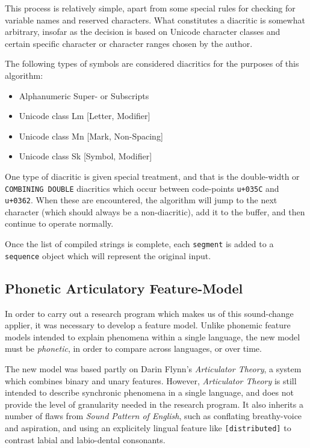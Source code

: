 \documentclass[10pt,letterpaper]{article}
\begin{document}
This process is relatively simple, apart from some special rules for checking for variable names and reserved characters. What constitutes a diacritic is somewhat arbitrary, insofar as the decision is based on Unicode character classes and certain specific character or character ranges chosen by the author.

The following types of symbols are considered diacritics for the purposes of this algorithm:
\begin{itemize}
\itemsep1pt \parskip0pt  
\item Alphanumeric Super- or Subscripts
\item Unicode class Lm [Letter, Modifier]
\item Unicode class Mn [Mark, Non-Spacing]
\item Unicode class Sk [Symbol, Modifier]
\end{itemize}

One type of diacritic is given special treatment, and that is the double-width or \texttt{COMBINING DOUBLE} diacritics which occur between code-points \texttt{u+035C} and \texttt{u+0362}. When these are encountered, the algorithm will jump to the next character (which should always be a non-diacritic), add it to the buffer, and then continue to operate normally.

Once the list of compiled strings is complete, each \texttt{segment} is added to a \texttt{sequence} object which will represent the original input.


\subsection{Phonetic Articulatory Feature-Model}
\label{sub:mafm}
In order to carry out a research program which makes us of this sound-change applier, it was necessary to develop a feature model. Unlike phonemic feature models intended to explain phenomena within a single language, the new model must be \emph{phonetic}, in order to compare across languages, or over time.

The new model was based partly on Darin Flynn's \emph{Articulator Theory}, a system which combines binary and unary features. However, \emph{Articulator Theory} is still intended to describe synchronic phenomena in a single language, and does not provide the level of granularity needed in the research program. It also inherits a number of flaws from \emph{Sound Pattern of English}, such as conflating breathy-voice and aspiration, and using an explicitely lingual feature like \texttt{[distributed]} to contrast labial and labio-dental consonants.
\end{document}
